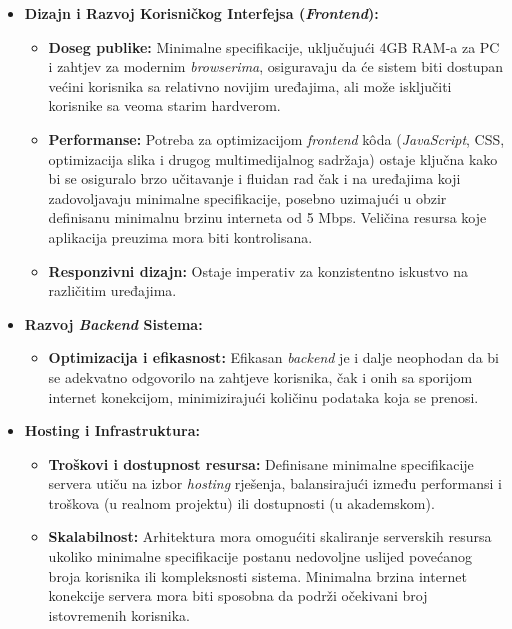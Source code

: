 \begin{itemize}
    \item \textbf{Dizajn i Razvoj Korisničkog Interfejsa (\textit{Frontend}):}
    
        \begin{itemize}
            \item \textbf{Doseg publike:} Minimalne specifikacije, uključujući 4GB RAM-a za PC i zahtjev za modernim \textit{browserima}, osiguravaju da će sistem biti dostupan većini korisnika sa relativno novijim uređajima, ali može isključiti korisnike sa veoma starim hardverom.
            
            \item \textbf{Performanse:} Potreba za optimizacijom \textit{frontend} kôda (\textit{JavaScript}, CSS, optimizacija slika i drugog multimedijalnog sadržaja) ostaje ključna kako bi se osiguralo brzo učitavanje i fluidan rad čak i na uređajima koji zadovoljavaju minimalne specifikacije, posebno uzimajući u obzir definisanu minimalnu brzinu interneta od 5 Mbps. Veličina resursa koje aplikacija preuzima mora biti kontrolisana.

            \item \textbf{Responzivni dizajn:} Ostaje imperativ za konzistentno iskustvo na različitim uređajima.
        \end{itemize}
        
    \item \textbf{Razvoj \textit{Backend} Sistema:}
    
        \begin{itemize}
            \item \textbf{Optimizacija i efikasnost:} Efikasan \textit{backend} je i dalje neophodan da bi se adekvatno odgovorilo na zahtjeve korisnika, čak i onih sa sporijom internet konekcijom, minimizirajući količinu podataka koja se prenosi.
        \end{itemize}
        
    \item \textbf{Hosting i Infrastruktura:}

        \begin{itemize}
            \item \textbf{Troškovi i dostupnost resursa:} Definisane minimalne specifikacije servera utiču na izbor \textit{hosting} rješenja, balansirajući između performansi i troškova (u realnom projektu) ili dostupnosti (u akademskom).
            
            \item \textbf{Skalabilnost:} Arhitektura mora omogućiti skaliranje serverskih resursa ukoliko minimalne specifikacije postanu nedovoljne uslijed povećanog broja korisnika ili kompleksnosti sistema. Minimalna brzina internet konekcije servera mora biti sposobna da podrži očekivani broj istovremenih korisnika.
        \end{itemize}
    

\end{itemize}
